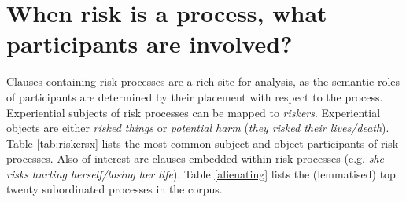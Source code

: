 		
		\section{When risk is a process, what participants are involved?}
		\FloatBarrier
		
		Clauses containing risk processes are a rich site for analysis, as the semantic roles of participants are determined by their placement with respect to the process. Experiential subjects of risk processes can be mapped to \emph{riskers}. Experiential objects are either \emph{risked things} or \emph{potential harm} (\emph{they risked their lives/death}). Table \ref{tab:riskersx} lists the most common subject and object participants of risk processes. Also of interest are clauses embedded within risk processes (e.g. \emph{she risks hurting herself/losing her life}). Table \ref{alienating} lists the (lemmatised) top twenty subordinated processes in the corpus.

